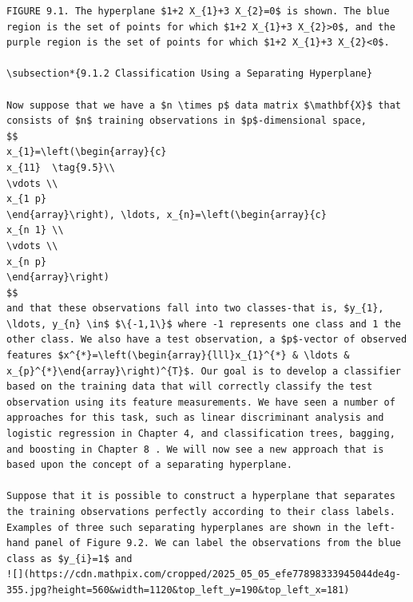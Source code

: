 \documentclass[10pt]{article}
\begin{document}
\begin{verbatim}
FIGURE 9.1. The hyperplane $1+2 X_{1}+3 X_{2}=0$ is shown. The blue region is the set of points for which $1+2 X_{1}+3 X_{2}>0$, and the purple region is the set of points for which $1+2 X_{1}+3 X_{2}<0$.

\subsection*{9.1.2 Classification Using a Separating Hyperplane}

Now suppose that we have a $n \times p$ data matrix $\mathbf{X}$ that consists of $n$ training observations in $p$-dimensional space,
$$
x_{1}=\left(\begin{array}{c}
x_{11}  \tag{9.5}\\
\vdots \\
x_{1 p}
\end{array}\right), \ldots, x_{n}=\left(\begin{array}{c}
x_{n 1} \\
\vdots \\
x_{n p}
\end{array}\right)
$$
and that these observations fall into two classes-that is, $y_{1}, \ldots, y_{n} \in$ $\{-1,1\}$ where -1 represents one class and 1 the other class. We also have a test observation, a $p$-vector of observed features $x^{*}=\left(\begin{array}{lll}x_{1}^{*} & \ldots & x_{p}^{*}\end{array}\right)^{T}$. Our goal is to develop a classifier based on the training data that will correctly classify the test observation using its feature measurements. We have seen a number of approaches for this task, such as linear discriminant analysis and logistic regression in Chapter 4, and classification trees, bagging, and boosting in Chapter 8 . We will now see a new approach that is based upon the concept of a separating hyperplane.

Suppose that it is possible to construct a hyperplane that separates the training observations perfectly according to their class labels. Examples of three such separating hyperplanes are shown in the left-hand panel of Figure 9.2. We can label the observations from the blue class as $y_{i}=1$ and
![](https://cdn.mathpix.com/cropped/2025_05_05_efe77898333945044de4g-355.jpg?height=560&width=1120&top_left_y=190&top_left_x=181)


\end{verbatim}
\end{document}
